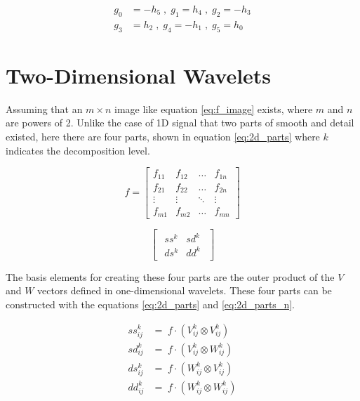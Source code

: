 \documentclass[12pt]{article}
\begin{document}
	\begin{equation}
		\begin{aligned}
			g_0 &= -h_5 \;,\; g_1 = h_4 \;,\; g_2 = -h_3 \\
			g_3 &= h_2 \;,\; g_4 = -h_1 \;,\; g_5 = h_0
		\end{aligned}
		\label{eq:g_sym2}
	\end{equation}
	
	\section{Two-Dimensional Wavelets}
	
	Assuming that an $m\times n$ image like equation \ref{eq:f_image} exists, where $m$ and $n$ are powers of 2. Unlike the case of 1D signal that two parts of smooth and detail existed, here there are four parts, shown in equation \ref{eq:2d_parts} where $k$ indicates the decomposition level.
	
	\begin{equation}
		f = 
		\begin{bmatrix}
			f_{11} & f_{12} & \dots & f_{1n} \\
			f_{21} & f_{22} & \dots & f_{2n} \\
			\vdots & \vdots & \ddots & \vdots \\
			f_{m1} & f_{m2} & \dots & f_{mn} 
		\end{bmatrix}
		\label{eq:f_image}
	\end{equation}
		
	\begin{equation}
		\begin{bmatrix}
		\begin{array}{c|c}
			ss^k & sd^k \\
			\hline
			ds^k & dd^k
		\end{array}
		\end{bmatrix}
	\end{equation}
	
	The basis elements for creating these four parts are the outer product of the $V$ and $W$ vectors defined in one-dimensional wavelets. These four parts can be constructed with the equations \ref{eq:2d_parts} and \ref{eq:2d_parts_n}.
	
	\begin{equation}
		\begin{aligned}
		ss_{ij}^k &= \; f \cdot (V_{ij}^k \otimes V_{ij}^k) \\
		sd_{ij}^k &= \; f \cdot (V_{ij}^k \otimes W_{ij}^k) \\
		ds_{ij}^k &= \; f \cdot (W_{ij}^k \otimes V_{ij}^k) \\
		dd_{ij}^k &= \; f \cdot (W_{ij}^k \otimes W_{ij}^k)
		\end{aligned}
		\label{eq:2d_parts}
	\end{equation}
\end{document}
